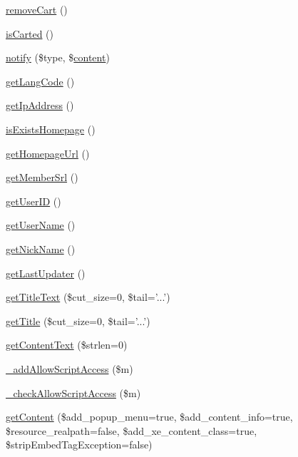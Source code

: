 \begin{DoxyCompactItemize}
\item 
\hyperlink{classdocumentItem_aa66932772c39aeff91238badd8246969}{remove\+Cart} ()
\item 
\hyperlink{classdocumentItem_a505c87502da3ca4b656230125ffa4f1e}{is\+Carted} ()
\item 
\hyperlink{classdocumentItem_afbccc4d35ce638fac62221e5602cc750}{notify} (\$type, \$\hyperlink{classcontent}{content})
\item 
\hyperlink{classdocumentItem_a7491640a855ace286820cb11f273ddb6}{get\+Lang\+Code} ()
\item 
\hyperlink{classdocumentItem_ac0e9b0006f067bc0918751148606d325}{get\+Ip\+Address} ()
\item 
\hyperlink{classdocumentItem_a7cc882ce0da6cbe675be8fdb980a0d97}{is\+Exists\+Homepage} ()
\item 
\hyperlink{classdocumentItem_ab9117599bb123e83289d2a24fd44bf50}{get\+Homepage\+Url} ()
\item 
\hyperlink{classdocumentItem_a75af5f05bd55c32bdc6c17dd8511e4e8}{get\+Member\+Srl} ()
\item 
\hyperlink{classdocumentItem_a66a8157a3cc7c82325eadcefe6390a58}{get\+User\+I\+D} ()
\item 
\hyperlink{classdocumentItem_a072696b683278c84bc3ebfee46d4216f}{get\+User\+Name} ()
\item 
\hyperlink{classdocumentItem_ab91ca9e1defb1a570212baa4f380706a}{get\+Nick\+Name} ()
\item 
\hyperlink{classdocumentItem_a784effc9e694d82da32e06e95482ff28}{get\+Last\+Updater} ()
\item 
\hyperlink{classdocumentItem_aad953dc30cf01a1d451cb90c66c09b0c}{get\+Title\+Text} (\$cut\+\_\+size=0, \$tail='...')
\item 
\hyperlink{classdocumentItem_a365509266cc36e56b66df824bc2fcbfc}{get\+Title} (\$cut\+\_\+size=0, \$tail='...')
\item 
\hyperlink{classdocumentItem_acdef9404e1dc50d82456fb112212e23e}{get\+Content\+Text} (\$strlen=0)
\item 
\hyperlink{classdocumentItem_a6bc6bbe65e83e9bfc03bae1fea5b75d7}{\+\_\+add\+Allow\+Script\+Access} (\$m)
\item 
\hyperlink{classdocumentItem_a0d88d945333c887802ad1f8442f5d5c7}{\+\_\+check\+Allow\+Script\+Access} (\$m)
\item 
\hyperlink{classdocumentItem_ab93870c122bc952a206f3c64ced3aa9e}{get\+Content} (\$add\+\_\+popup\+\_\+menu=true, \$add\+\_\+content\+\_\+info=true, \$resource\+\_\+realpath=false, \$add\+\_\+xe\+\_\+content\+\_\+class=true, \$strip\+Embed\+Tag\+Exception=false)

\end{DoxyCompactItemize}
